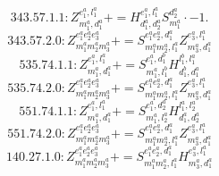 \documentclass[letterpaper,10pt,fleqn,leqno,onecolumn]{article}
\begin{document}
\begin{equation} \;\;\;\;\;\;  343.57.1.1: Z^{e_{1}^{a},l_{1}^{a}}_{m_{1}^{a},d_{1}^{a}}+=H^{e_{1}^{a},l_{1}^{a}}_{d_{1}^{a},d_{2}^{a}}S^{d_{2}^{a}}_{m_{1}^{a}}\cdot -1. \end{equation}
\begin{equation} \;\;\;\;\;\;  343.57.2.0: Z^{e_{1}^{a}e_{2}^{a}e_{3}^{a}}_{m_{1}^{a}m_{2}^{a}m_{3}^{a}}+=S^{e_{1}^{a}e_{2}^{a},d_{1}^{a}}_{m_{1}^{a}m_{2}^{a},l_{1}^{a}}Z^{e_{3}^{a},l_{1}^{a}}_{m_{3}^{a},d_{1}^{a}} \end{equation}
\begin{equation} \;\;\;\;\;\;  535.74.1.1: Z^{e_{1}^{a},l_{1}^{a}}_{m_{1}^{a},d_{1}^{a}}+=S^{e_{1}^{a},d_{1}^{b}}_{m_{1}^{a},l_{1}^{b}}H^{l_{1}^{b},l_{1}^{a}}_{d_{1}^{b},d_{1}^{a}} \end{equation}
\begin{equation} \;\;\;\;\;\;  535.74.2.0: Z^{e_{1}^{a}e_{2}^{a}e_{3}^{a}}_{m_{1}^{a}m_{2}^{a}m_{3}^{a}}+=S^{e_{1}^{a}e_{2}^{a},d_{1}^{a}}_{m_{1}^{a}m_{2}^{a},l_{1}^{a}}Z^{e_{3}^{a},l_{1}^{a}}_{m_{3}^{a},d_{1}^{a}} \end{equation}
\begin{equation} \;\;\;\;\;\;  551.74.1.1: Z^{e_{1}^{a},l_{1}^{a}}_{m_{1}^{a},d_{1}^{a}}+=S^{e_{1}^{a},d_{2}^{a}}_{m_{1}^{a},l_{2}^{a}}H^{l_{1}^{a},l_{2}^{a}}_{d_{1}^{a},d_{2}^{a}} \end{equation}
\begin{equation} \;\;\;\;\;\;  551.74.2.0: Z^{e_{1}^{a}e_{2}^{a}e_{3}^{a}}_{m_{1}^{a}m_{2}^{a}m_{3}^{a}}+=S^{e_{1}^{a}e_{2}^{a},d_{1}^{a}}_{m_{1}^{a}m_{2}^{a},l_{1}^{a}}Z^{e_{3}^{a},l_{1}^{a}}_{m_{3}^{a},d_{1}^{a}} \end{equation}
\begin{equation} \;\;\;\;\;\;  140.27.1.0: Z^{e_{1}^{a}e_{2}^{a}e_{3}^{a}}_{m_{1}^{a}m_{2}^{a}m_{3}^{a}}+=S^{e_{1}^{a}e_{2}^{a},d_{1}^{a}}_{m_{1}^{a}m_{2}^{a},l_{1}^{a}}H^{e_{3}^{a},l_{1}^{a}}_{m_{3}^{a},d_{1}^{a}} \end{equation}
\end{document}
